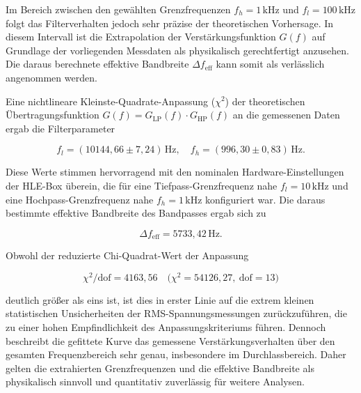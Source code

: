 Im Bereich zwischen den gewählten Grenzfrequenzen $f_h = 1\,\mathrm{kHz}$ und $f_l = 100\,\mathrm{kHz}$ folgt das Filterverhalten jedoch sehr präzise der theoretischen Vorhersage. 
In diesem Intervall ist die Extrapolation der Verstärkungsfunktion $G(f)$ auf Grundlage der vorliegenden Messdaten als physikalisch gerechtfertigt anzusehen. 
Die daraus berechnete effektive Bandbreite $\Delta f_{\mathrm{eff}}$ kann somit als verlässlich angenommen werden.

Eine nichtlineare Kleinste-Quadrate-Anpassung ($\chi^2$) der theoretischen Übertragungsfunktion $G(f)=G_{\mathrm{LP}}(f)\cdot G_{\mathrm{HP}}(f)$ an die gemessenen Daten ergab die Filterparameter

\begin{equation}
  f_l = (10144{,}66 \pm 7{,}24)\,\mathrm{Hz}, 
  \quad
  f_h = (996{,}30 \pm 0{,}83)\,\mathrm{Hz}.
\end{equation}

Diese Werte stimmen hervorragend mit den nominalen Hardware-Einstellungen der HLE-Box überein, die für eine Tiefpass-Grenzfrequenz nahe $f_l = 10\,\mathrm{kHz}$ und eine Hochpass-Grenzfrequenz nahe $f_h = 1\,\mathrm{kHz}$ konfiguriert war. 
Die daraus bestimmte effektive Bandbreite des Bandpasses ergab sich zu

\begin{equation}
  \Delta f_{\mathrm{eff}} = 5733{,}42\,\mathrm{Hz}.
\end{equation}

Obwohl der reduzierte Chi-Quadrat-Wert der Anpassung

\begin{equation}
  \chi^2/\mathrm{dof} = 4163{,}56
  \quad
  \bigl(\chi^2 = 54126{,}27,\ \mathrm{dof} = 13\bigr)
\end{equation}

deutlich größer als eins ist, ist dies in erster Linie auf die extrem kleinen statistischen Unsicherheiten der RMS-Spannungsmessungen zurückzuführen, die zu einer hohen Empfindlichkeit des Anpassungskriteriums führen. 
Dennoch beschreibt die gefittete Kurve das gemessene Verstärkungsverhalten über den gesamten Frequenzbereich sehr genau, insbesondere im Durchlassbereich. 
Daher gelten die extrahierten Grenzfrequenzen und die effektive Bandbreite als physikalisch sinnvoll und quantitativ zuverlässig für weitere Analysen.
